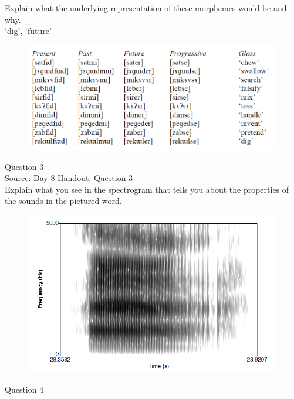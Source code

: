 \documentclass[12pt]{article}
\begin{document}
Explain what the underlying representation of these morphemes would be and why.\\

`dig', `future'

\begin{figure}[H]
\includegraphics{../images/final_dataset.png}
\end{figure}

\newpage

{\large Question 3}\\

Source: Day 8 Handout, Question 3\\

Explain what you see in the spectrogram that tells you about the properties of the sounds in the pictured word.\\

\begin{figure}[H]
\includegraphics{../images/spectrogram_aaah.png}
\end{figure}

\newpage

{\large Question 4}\\
\end{document}

